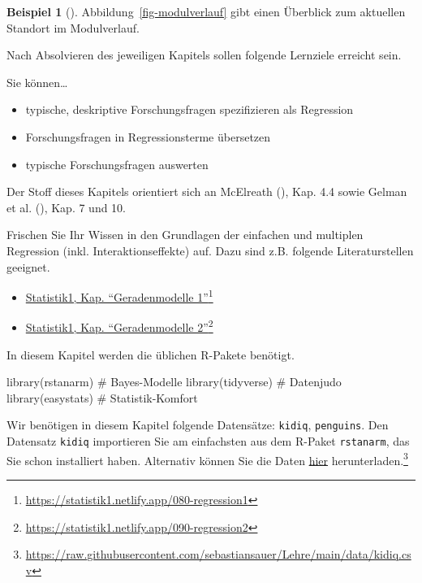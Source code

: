 \documentclass[
  ngerman,
  letterpaper,
  twoside,
  open=any]{scrbook}
\newenvironment{Shaded}{\begin{snugshade}}{\end{snugshade}}
\newcommand{\CommentTok}[1]{\textcolor[rgb]{0.37,0.37,0.37}{#1}}
\newcommand{\FunctionTok}[1]{\textcolor[rgb]{0.28,0.35,0.67}{#1}}
\newcommand{\NormalTok}[1]{\textcolor[rgb]{0.00,0.23,0.31}{#1}}
\providecommand{\tightlist}{%
  \setlength{\itemsep}{0pt}\setlength{\parskip}{0pt}}\usepackage{longtable,booktabs,array}
\theoremstyle{definition}
\newtheorem{example}{Beispiel}[chapter]
\theoremstyle{plain}
\theoremstyle{definition}
\theoremstyle{definition}
\theoremstyle{remark}
\begin{document}
\begin{example}[]
Abbildung~\ref{fig-modulverlauf} gibt einen Überblick zum aktuellen
Standort im Modulverlauf.

Nach Absolvieren des jeweiligen Kapitels sollen folgende Lernziele
erreicht sein.

Sie können\ldots{}

\begin{itemize}
\tightlist
\item
  typische, deskriptive Forschungsfragen spezifizieren als Regression
\item
  Forschungsfragen in Regressionsterme übersetzen
\item
  typische Forschungsfragen auswerten
\end{itemize}

Der Stoff dieses Kapitels orientiert sich an McElreath
(), Kap. 4.4 sowie Gelman et al.
(), Kap. 7 und 10.

Frischen Sie Ihr Wissen in den Grundlagen der einfachen und multiplen
Regression (inkl. Interaktionseffekte) auf. Dazu sind z.B. folgende
Literaturstellen geeignet.

\begin{itemize}
\tightlist
\item
  \href{https://statistik1.netlify.app/080-regression1}{Statistik1, Kap.
  \enquote{Geradenmodelle 1}}\footnote{\url{https://statistik1.netlify.app/080-regression1}}
\item
  \href{https://statistik1.netlify.app/090-regression2}{Statistik1, Kap.
  \enquote{Geradenmodelle 2}}\footnote{\url{https://statistik1.netlify.app/090-regression2}}
\end{itemize}

In diesem Kapitel werden die üblichen R-Pakete benötigt.

\begin{Shaded}
\begin{Highlighting}[]
\FunctionTok{library}\NormalTok{(rstanarm)   }\CommentTok{\# Bayes{-}Modelle}
\FunctionTok{library}\NormalTok{(tidyverse)  }\CommentTok{\# Datenjudo}
\FunctionTok{library}\NormalTok{(easystats)  }\CommentTok{\# Statistik{-}Komfort}
\end{Highlighting}
\end{Shaded}

Wir benötigen in diesem Kapitel folgende Datensätze: \texttt{kidiq},
\texttt{penguins}. Den Datensatz \texttt{kidiq} importieren Sie am
einfachsten aus dem R-Paket \texttt{rstanarm}, das Sie schon installiert
haben. Alternativ können Sie die Daten
\href{https://raw.githubusercontent.com/sebastiansauer/Lehre/main/data/kidiq.csv}{hier}
herunterladen.\footnote{\url{https://raw.githubusercontent.com/sebastiansauer/Lehre/main/data/kidiq.csv}}


\end{example}
\end{document}
